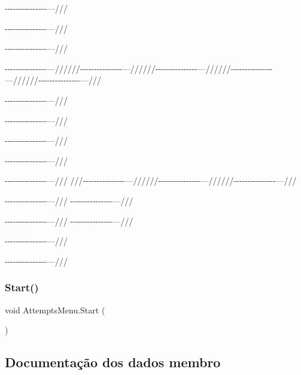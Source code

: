 -\/-\/-\/-\/-\/-\/-\/-\/-\/-\/-\/-\/-\/-\/-\/---///

-\/-\/-\/-\/-\/-\/-\/-\/-\/-\/-\/-\/-\/-\/-\/---///

-\/-\/-\/-\/-\/-\/-\/-\/-\/-\/-\/-\/-\/-\/-\/---///

-\/-\/-\/-\/-\/-\/-\/-\/-\/-\/-\/-\/-\/-\/-\/---//////-\/-\/-\/-\/-\/-\/-\/-\/-\/-\/-\/-\/-\/-\/-\/---//////-\/-\/-\/-\/-\/-\/-\/-\/-\/-\/-\/-\/-\/-\/-\/---//////-\/-\/-\/-\/-\/-\/-\/-\/-\/-\/-\/-\/-\/-\/-\/---//////-\/-\/-\/-\/-\/-\/-\/-\/-\/-\/-\/-\/-\/-\/-\/---///

-\/-\/-\/-\/-\/-\/-\/-\/-\/-\/-\/-\/-\/-\/-\/---///

-\/-\/-\/-\/-\/-\/-\/-\/-\/-\/-\/-\/-\/-\/-\/---///

-\/-\/-\/-\/-\/-\/-\/-\/-\/-\/-\/-\/-\/-\/-\/---///

-\/-\/-\/-\/-\/-\/-\/-\/-\/-\/-\/-\/-\/-\/-\/---///

-\/-\/-\/-\/-\/-\/-\/-\/-\/-\/-\/-\/-\/-\/-\/---/// ///-\/-\/-\/-\/-\/-\/-\/-\/-\/-\/-\/-\/-\/-\/-\/---//////-\/-\/-\/-\/-\/-\/-\/-\/-\/-\/-\/-\/-\/-\/-\/---//////-\/-\/-\/-\/-\/-\/-\/-\/-\/-\/-\/-\/-\/-\/-\/---///

-\/-\/-\/-\/-\/-\/-\/-\/-\/-\/-\/-\/-\/-\/-\/---/// -\/-\/-\/-\/-\/-\/-\/-\/-\/-\/-\/-\/-\/-\/-\/---///

-\/-\/-\/-\/-\/-\/-\/-\/-\/-\/-\/-\/-\/-\/-\/---/// -\/-\/-\/-\/-\/-\/-\/-\/-\/-\/-\/-\/-\/-\/-\/---///

-\/-\/-\/-\/-\/-\/-\/-\/-\/-\/-\/-\/-\/-\/-\/---///

-\/-\/-\/-\/-\/-\/-\/-\/-\/-\/-\/-\/-\/-\/-\/---/// \mbox{\label{class_attempts_menu_ae4a4930a24e331b2fdaf2bc215c3449c}} 
\subsubsection{Start()}
{\footnotesize\ttfamily void Attempts\+Menu.\+Start (\begin{DoxyParamCaption}{ }\end{DoxyParamCaption})}



\subsection{Documentação dos dados membro}
\mbox{\label{class_attempts_menu_af0f61cfb62cbacf7ae6d5412d5c31ec0}} 
